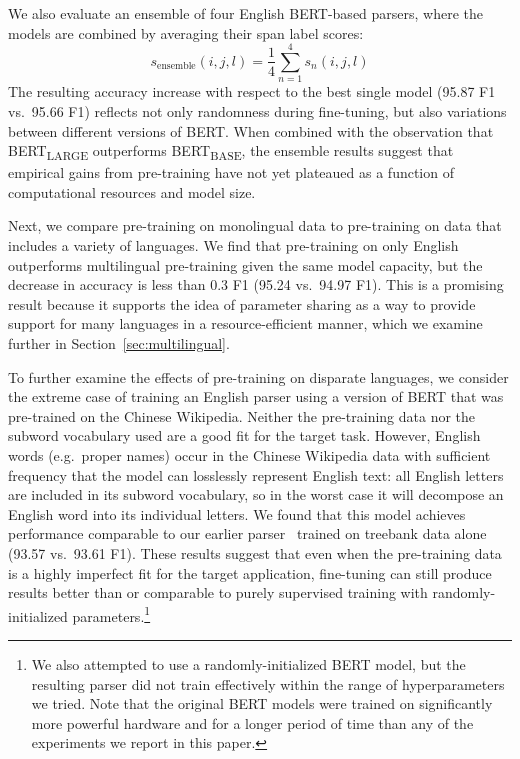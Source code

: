 \documentclass[11pt,a4paper]{article}
\begin{document}
We also evaluate an ensemble of four English BERT-based parsers, where the models are combined by averaging their span label scores:
\[
s_{\text{ensemble}}(i,j,l) = \frac{1}{4} \sum_{n=1}^4 s_n(i,j,l)
\]
The resulting accuracy increase with respect to the best single model (95.87 F1 vs.\ 95.66 F1) reflects not only randomness during fine-tuning, but also variations between different versions of BERT. When combined with the observation that BERT\textsubscript{LARGE} outperforms BERT\textsubscript{BASE}, the ensemble results suggest that empirical gains from pre-training have not yet plateaued as a function of computational resources and model size.

Next, we compare pre-training on monolingual data to pre-training on data that includes a variety of languages. We find that pre-training on only English outperforms multilingual pre-training given the same model capacity, but the decrease in accuracy is less than 0.3 F1 (95.24 vs.\ 94.97 F1). This is a promising result because it supports the idea of parameter sharing as a way to provide support for many languages in a resource-efficient manner, which we examine further in Section~\ref{sec:multilingual}.

To further examine the effects of pre-training on disparate languages, we consider the extreme case of training an English parser using a version of BERT that was pre-trained on the Chinese Wikipedia.
Neither the pre-training data nor the subword vocabulary used are a good fit for the target task.
However, English words (e.g.\ proper names) occur in the Chinese Wikipedia data with sufficient frequency that the model can losslessly represent English text: all English letters are included in its subword vocabulary, so in the worst case it will decompose an English word into its individual letters. We found that this model achieves performance comparable to our earlier parser~\citep{kitaev_2018_self_attentive} trained on treebank data alone (93.57 vs.\ 93.61 F1). These results suggest that even when the pre-training data is a highly imperfect fit for the target application, fine-tuning can still produce results better than or comparable to purely supervised training with randomly-initialized parameters.\footnote{We also attempted to use a randomly-initialized BERT model, but the resulting parser did not train effectively within the range of hyperparameters we tried. Note that the original BERT models were trained on significantly more powerful hardware and for a longer period of time than any of the experiments we report in this paper.}
\end{document}
